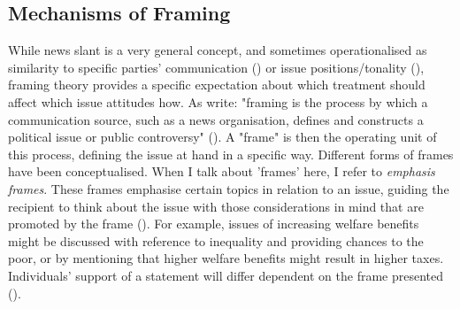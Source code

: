 \documentclass{article}
\begin{document}




\subsection{Mechanisms of Framing}

While news slant is a very general concept, and sometimes operationalised as similarity to specific parties' communication (\cite{Gentzkow2010}) or issue positions/tonality (\cite{Spirig2020}), framing theory provides a specific expectation about which treatment should affect which issue attitudes how. As \citeauthor{Nelson1997} write: "framing is the process by which a communication source, such as a news organisation, defines and constructs a political issue or public controversy" (\citeyear[567]{Nelson1997}). A "frame" is then the operating unit of this process, defining the issue at hand in a specific way. Different forms of frames have been conceptualised. When I talk about 'frames' here, I refer to \textit{emphasis frames}. These frames emphasise certain topics in relation to an issue, guiding the recipient to think about the issue with those considerations in mind that are promoted by the frame (\cite[153f]{Leeper2020}). For example, issues of increasing welfare benefits might be discussed with reference to inequality and providing chances to the poor, or by mentioning that higher welfare benefits might result in higher taxes. Individuals' support of a statement will differ dependent on the frame presented (\cite{sniderman2004structure}).
\end{document}
